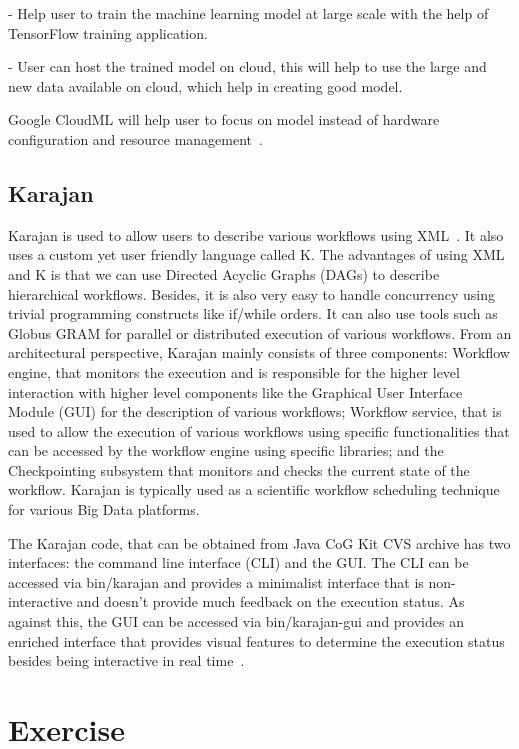 {     - Help user to train the machine learning model at large scale
       with the help of TensorFlow  training application.
	
     - User can host the trained model on cloud,  this will help
       to use the large and new data available on cloud, which help in
       creating good model.

       Google CloudML will help user to focus on model instead of
       hardware configuration and resource
       management~\cite{www-googlecloudoverview}.

\subsection{Karajan}

Karajan is used to allow users to describe various workflows using
XML~\cite{RMBDP-Book-1}.  It also uses a custom yet user friendly
language called K.  The advantages of using XML and K is that we can
use Directed Acyclic Graphs (DAGs) to describe hierarchical workflows.
Besides, it is also very easy to handle concurrency using trivial
programming constructs like if/while orders.  It can also use tools
such as Globus GRAM for parallel or distributed execution of various
workflows.  From an architectural perspective, Karajan mainly consists
of three components: Workflow engine, that monitors the execution and
is responsible for the higher level interaction with higher level
components like the Graphical User Interface Module (GUI) for the
description of various workflows; Workflow service, that is used to
allow the execution of various workflows using specific
functionalities that can be accessed by the workflow engine using
specific libraries; and the Checkpointing subsystem that monitors and
checks the current state of the workflow.  Karajan is typically used
as a scientific workflow scheduling technique for various Big Data
platforms.

The Karajan code, that can be obtained from Java CoG Kit CVS archive
has two interfaces: the command line interface (CLI) and the GUI.  The
CLI can be accessed via bin/karajan and provides a minimalist
interface that is non-interactive and doesn't provide much feedback on
the execution status.  As against this, the GUI can be accessed via
bin/karajan-gui and provides an enriched interface that provides
visual features to determine the execution status besides being
interactive in real time~\cite{Karajan-interfaces}.


\section{Exercise}

}

